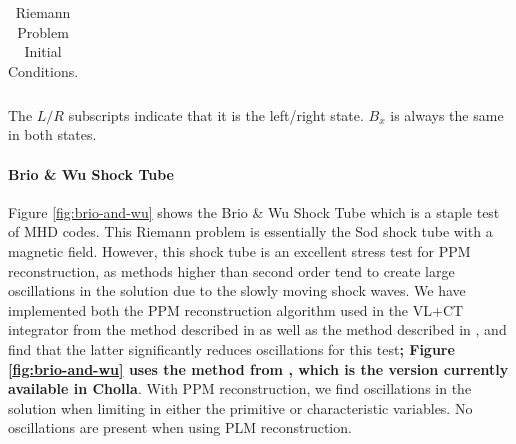 \documentclass[modern]{aastex631}
\begin{document}
\begin{table}
\begin{tabular}{lcccccccc}


    \end{tabular}
    \caption{Riemann Problem Initial Conditions.} The $L/R$ subscripts indicate that it is the left/right state. $B_x$ is always the same in both states.
    \label{table:riemann}
\end{table}

\paragraph{Brio \& Wu Shock Tube}
Figure \ref{fig:brio-and-wu} shows the Brio \& Wu Shock Tube \citep{brio_wu_1988} which is a staple test of MHD codes. This Riemann problem is essentially the Sod shock tube \citep{sod_1978} with a magnetic field. However, this shock tube is an excellent stress test for PPM reconstruction, as methods higher than second order tend to create large oscillations in the solution due to the slowly moving shock waves. We have implemented both the PPM reconstruction algorithm used in the VL+CT integrator from the method described in \cite{stone_athena_2008} as well as the method described in \cite{felker_2018}, and find that the latter significantly reduces oscillations for this test\textbf{; Figure \ref{fig:brio-and-wu} uses the method from \cite{felker_2018}, which is the version currently available in Cholla}. With PPM reconstruction, we find  oscillations in the solution when limiting in either the primitive or characteristic variables. No oscillations are present when using PLM reconstruction.
\end{document}
